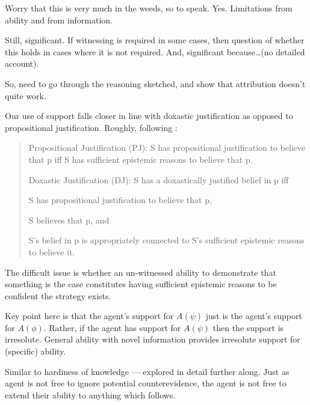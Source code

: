 \documentclass[10pt]{article}
\newcommand{\hozlinedash}[0]{%
  \noindent\hdashrule[0.5ex][c]{\textwidth}{.1pt}{2.5pt}
}
\begin{document}
\begin{note}
  Worry that this is very much in the weeds, so to speak.
  Yes.
  Limitations from ability and from information.

  Still, significant.
  If witnessing is required in some cases, then question of whether this holds in cases where it is not required.
  And, significant because\dots (no detailed account).
\end{note}

\begin{note}[Hum]
  So, need to go through the reasoning sketched, and show that attribution doesn't quite work.
\end{note}


\hozlinedash

\begin{note}
  Our use of support falls closer in line with doxastic justification as opposed to propositional justification.
  Roughly, following \textcite{Silva:2020aa}:

  \begin{quote}
    Propositional Justification (PJ): S has propositional justification to believe that p iff S has sufficient epistemic reasons to believe that p.

    Doxastic Justification (DJ): S has a doxastically justified belief in p iff
    \begin{enumerate*}[label=(\roman*)]
    \item S has propositional justification to believe that p,
    \item S believes that p, and
    \item S’s belief in p is appropriately connected to S’s sufficient epistemic reasons to believe it.
    \end{enumerate*}
  \end{quote}
  The difficult issue is whether an un-witnessed ability to demonstrate that something is the case constitutes having sufficient epistemic reasons to be confident the strategy exists.
\end{note}

\hozlinedash

\begin{note}
  {
    \color{red}
    Key point here is that the agent's support for \(A(\psi)\) just is the agent's support for \(A(\phi)\).
    Rather, if the agent has support for \(A(\psi)\) then the support is irresolute.
  }
  General ability with novel information provides irresolute support for (specific) ability.

  {
    \color{red}
    Similar to hardiness of knowledge --- explored in detail further along.
    Just as agent is not free to ignore potential counterevidence, the agent is not free to extend their ability to anything which follows.
  }
\end{note}
\end{document}
